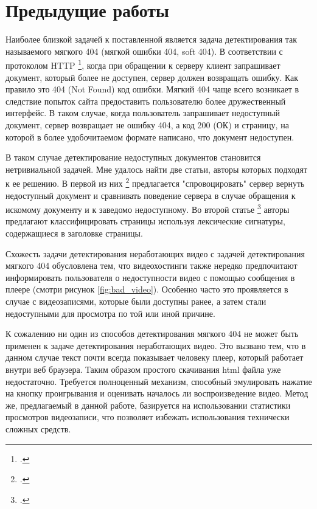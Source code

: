 \chapter{Предыдущие работы}

Наиболее близкой задачей к поставленной является задача детектирования так называемого мягкого 404 (мягкой ошибки 404, soft 404). В соответствии с протоколом HTTP \footcite{Fielding2014}, когда при обращении к серверу клиент запрашивает документ, который более не доступен, сервер должен возвращать ошибку. Как правило это 404 (Not Found) код ошибки. Мягкий 404 чаще всего возникает в следствие попыток сайта предоставить пользователю более дружественный интерфейс. В таком случае, когда пользователь запрашивает недоступный документ, сервер возвращает не ошибку 404, а код 200 (ОК) и страницу, на которой в более удобочитаемом формате написано, что документ недоступен.

В таком случае детектирование недоступных документов становится нетривиальной задачей. Мне удалось найти две статьи, авторы которых подходят к ее решению. В первой из них \footcite{Bar-Yossef2004} предлагается "спровоцировать" сервер вернуть недоступный документ и сравнивать поведение сервера в случае обращения к искомому документу и к заведомо недоступному. Во второй статье \footcite{Meneses2012} авторы предлагают классифицировать страницы используя лексические сигнатуры, содержащиеся в заголовке страницы.

Схожесть задачи детектирования неработающих видео с задачей детектирования мягкого 404 обусловлена тем, что видеохостинги также нередко предпочитают информировать пользователя о недоступности видео с помощью сообщения в плеере (смотри рисунок \ref{fig:bad_video}). Особенно часто это проявляется в случае с видеозаписями, которые были доступны ранее, а затем стали недоступными для просмотра по той или иной причине.

К сожалению ни один из способов детектирования мягкого 404 не может быть применен к задаче детектирования неработающих видео. Это вызвано тем, что в данном случае текст почти всегда показывает человеку плеер, который работает внутри веб браузера. Таким образом простого скачивания html файла уже недостаточно. Требуется полноценный механизм, способный эмулировать нажатие на кнопку проигрывания и оценивать началось ли воспроизведение видео. Метод же, предлагаемый в данной работе, базируется на использовании статистики просмотров видеозаписи, что позволяет избежать использования технически сложных средств.